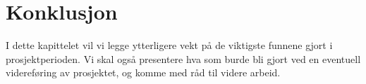 \cleardoublepage
\chapter{Konklusjon}
\label{chap:conclusion} 

I dette kapittelet vil vi legge ytterligere vekt på de viktigste funnene gjort i prosjektperioden. Vi skal også presentere hva som burde bli gjort ved en eventuell videreføring av prosjektet, og komme med råd til videre arbeid.





